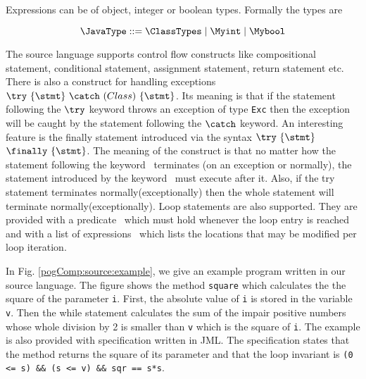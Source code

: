     Expressions can be of object, integer or boolean types. Formally the types are 

$$ \JavaType ::= \ClassTypes \mid \Myint \mid \Mybool $$ 





  The source language supports control flow constructs like 
  compositional statement, conditional statement, assignment statement, return statement etc.
  There is also a construct for handling exceptions $ \try  \ \{ \stmt \}  \ \catch \ ( Class  )\ \{ \stmt \}  $.
  Its meaning is that if the statement following the $ \try $ keyword throws an exception of type \texttt{Exc} then
  the exception will be caught by the statement following the  $ \catch $ keyword. An interesting feature  is the finally statement
  introduced via the syntax $ \try  \ \{ \stmt \}  $ $ \finally \ \{ \stmt \}$.  The meaning of the construct is that  
  no matter how the statement following the keyword \try \ terminates (on an exception or normally),
  the statement introduced by the keyword \finally \ must execute after it. Also, if the try statement terminates normally(exceptionally) then the
  whole statement will terminate normally(exceptionally).
  Loop statements are also supported.  They are provided with a predicate \invariant \ which must hold whenever 
  the loop entry is reached and with a list of expressions
   \modLoop \ which lists the locations that  may be modified per loop iteration.

In Fig. \ref{pogComp:source:example}, we give an example program written in our source language. The figure shows 
the method \lstinline!square! which calculates the 
the   square of the parameter \lstinline!i!. First, the absolute value of \lstinline!i! is stored in the variable \lstinline!v!.
Then  the while statement  calculates the sum of the impair positive numbers whose whole division by 2 is smaller than
\lstinline!v! which is the square of \lstinline!i!.  The example is also
provided with specification written in JML. The specification states
that the method returns the square of its parameter and that the loop
invariant is \lstinline!(0 <= s) && (s <= v) && sqr == s*s!.

